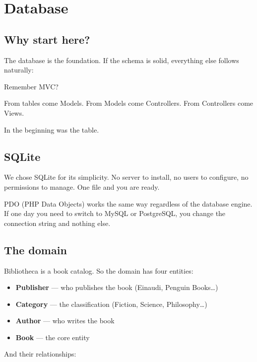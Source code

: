 \documentclass[11pt,a4paper,oneside]{book}
\providecommand{\tightlist}{%
  \setlength{\itemsep}{0pt}\setlength{\parskip}{0pt}}
\begin{document}
\newpage

\hypertarget{database}{%
\chapter{Database}\label{database}}

\hypertarget{why-start-here}{%
\section{Why start here?}\label{why-start-here}}

The database is the foundation. If the schema is solid,
everything else follows naturally:

Remember MVC?

From tables come Models. From Models come Controllers. From
Controllers come Views.

In the beginning was the table.

\hypertarget{sqlite}{%
\section{SQLite}\label{sqlite}}

We chose SQLite for its simplicity. No server to install, no
users to configure, no permissions to manage. One file and you
are ready.

PDO (PHP Data Objects) works the same way regardless of the
database engine. If one day you need to switch to MySQL or
PostgreSQL, you change the connection string and nothing else.

\hypertarget{the-domain}{%
\section{The domain}\label{the-domain}}

Bibliotheca is a book catalog. So the domain has four entities:

\begin{itemize}
\tightlist
\item
  \textbf{Publisher} --- who publishes the book (Einaudi, Penguin
  Books\ldots)
\item
  \textbf{Category} --- the classification (Fiction, Science,
  Philosophy\ldots)
\item
  \textbf{Author} --- who writes the book
\item
  \textbf{Book} --- the core entity
\end{itemize}

And their relationships:
\end{document}
